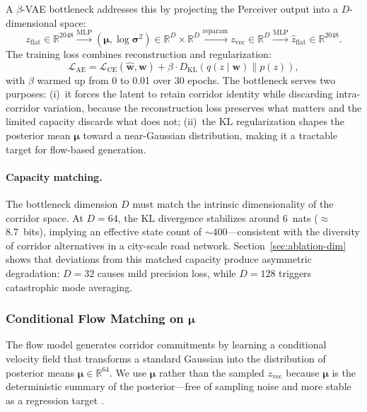 A $\beta$-VAE bottleneck addresses this by projecting the Perceiver output into a $D$-dimensional space:
\begin{equation}
  z_{\text{flat}} \in \mathbb{R}^{2048}
  \xrightarrow{\mathrm{MLP}}
  (\boldsymbol{\mu}, \log \boldsymbol{\sigma}^2) \in \mathbb{R}^D \times \mathbb{R}^D
  \xrightarrow{\text{reparam}}
  z_{\text{vec}} \in \mathbb{R}^D
  \xrightarrow{\mathrm{MLP}}
  \hat{z}_{\text{flat}} \in \mathbb{R}^{2048}.
  \label{eq:bottleneck}
\end{equation}
The training loss combines reconstruction and regularization:
\begin{equation}
  \mathcal{L}_{\mathrm{AE}} = \mathcal{L}_{\mathrm{CE}}(\hat{\mathbf{w}}, \mathbf{w}) + \beta \cdot D_{\mathrm{KL}}(q(z \mid \mathbf{w}) \| p(z)),
  \label{eq:ae-loss}
\end{equation}
with $\beta$ warmed up from 0 to 0.01 over 30 epochs.
The bottleneck serves two purposes: (i)~it forces the latent to retain corridor identity while discarding intra-corridor variation, because the reconstruction loss preserves what matters and the limited capacity discards what does not; (ii)~the KL regularization shapes the posterior mean $\boldsymbol{\mu}$ toward a near-Gaussian distribution, making it a tractable target for flow-based generation.

\paragraph{Capacity matching.}
The bottleneck dimension $D$ must match the intrinsic dimensionality of the corridor space.
At $D\!=\!64$, the KL divergence stabilizes around 6~nats ($\approx$8.7~bits), implying an effective state count of $\sim\!400$---consistent with the diversity of corridor alternatives in a city-scale road network.
Section~\ref{sec:ablation-dim} shows that deviations from this matched capacity produce asymmetric degradation: $D\!=\!32$ causes mild precision loss, while $D\!=\!128$ triggers catastrophic mode averaging.

\subsubsection{Conditional Flow Matching on $\boldsymbol{\mu}$}
\label{sec:flow}

The flow model generates corridor commitments by learning a conditional velocity field that transforms a standard Gaussian into the distribution of posterior means $\boldsymbol{\mu} \in \mathbb{R}^{64}$.
We use $\boldsymbol{\mu}$ rather than the sampled $z_{\text{vec}}$ because $\boldsymbol{\mu}$ is the deterministic summary of the posterior---free of sampling noise and more stable as a regression target \citep{lipman2023flow}.

